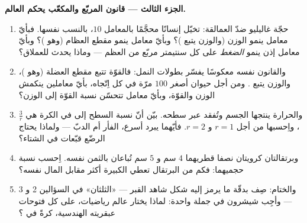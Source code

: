 \begin{problem}
\medskip
\noindent\textbf{الجزء الثالث --- قانون المربّع والمكعّب يحكم
العالم.}
\begin{enumerate}[resume]
  \item حجّة غاليليو ضدّ العمالقة: تخيّل إنسانًا محجَّمًا
        بالمعامل $10$، بالنسب نفسها. فبأيّ معامل ينمو الوزن
        (والوزن يتبع )؟ وبأيّ معامل ينمو مقطع العظام
        (وهو )؟ وبأيّ معامل إذن ينمو \emph{الضغط} على كل
        سنتيمتر مربّع من العظم --- وماذا يحدث للعملاق؟
  \item والقانون نفسه معكوسًا يفسّر بطولات النمل: فالقوّة تتبع
        مقطع العضلة (وهو )، والوزن يتبع . ومن أجل
        حيوان أصغر $100$ مرّة في كل اِتّجاه، بأيّ معاملين ينكمش
        الوزن والقوّة، وبأيّ معامل تتحسّن نسبة القوّة إلى الوزن؟
  \item والحرارة ينتجها  الجسم وتُفقد عبر سطحه. بيّن أنّ
        نسبة السطح إلى  في الكرة هي $\frac{3}{r}$،
        واِحسبها من أجل $r = 1$ و $r = 2$. فأيّهما يبرد أسرع،
        الفأر أم الدبّ --- ولماذا يحتاج الرضّع قبّعات في
        الشتاء؟
  \item وبرتقالتان كرويتان نصفا قطريهما $4$ سم و $5$ سم
        تُباعان بالثمن نفسه. اِحسب نسبة حجميهما: فكم من
        البرتقال تعطي الكبيرة أكثر مقابل المال نفسه؟
  \item والختام: صِف بدقّة ما يرمز إليه شكل شاهد القبر ---
        «الثلثان» في السؤالين 2 و 3 --- وأجِب شيشرون في جملة
        واحدة: لماذا يختار عالم رياضيات، على كل فتوحات عبقريته
        الهندسية، كرةً في ؟
\end{enumerate}
\end{problem}
